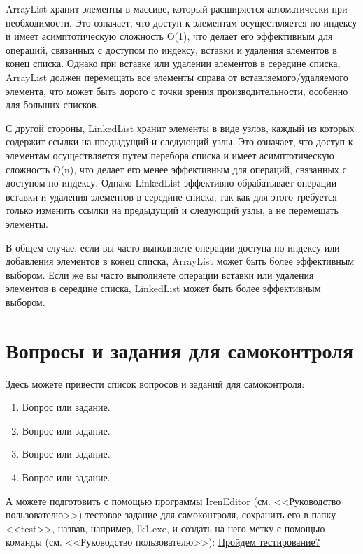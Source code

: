 ArrayList хранит элементы в массиве, который расширяется автоматически при необходимости. Это означает, что доступ к элементам осуществляется по индексу и имеет асимптотическую сложность O(1), что делает его эффективным для операций, связанных с доступом по индексу, вставки и удаления элементов в конец списка. Однако при вставке или удалении элементов в середине списка, ArrayList должен перемещать все элементы справа от вставляемого/удаляемого элемента, что может быть дорого с точки зрения производительности, особенно для больших списков.

С другой стороны, LinkedList хранит элементы в виде узлов, каждый из которых содержит ссылки на предыдущий и следующий узлы. Это означает, что доступ к элементам осуществляется путем перебора списка и имеет асимптотическую сложность O(n), что делает его менее эффективным для операций, связанных с доступом по индексу. Однако LinkedList эффективно обрабатывает операции вставки и удаления элементов в середине списка, так как для этого требуется только изменить ссылки на предыдущий и следующий узлы, а не перемещать элементы.

В общем случае, если вы часто выполняете операции доступа по индексу или добавления элементов в конец списка, ArrayList может быть более эффективным выбором. Если же вы часто выполняете операции вставки или удаления элементов в середине списка, LinkedList может быть более эффективным выбором.

\section*{Вопросы и задания для самоконтроля}%

Здесь можете привести список вопросов и заданий для самоконтроля:
\begin{enumerate}%
\item Вопрос или задание.
\item Вопрос или задание.
\item Вопрос или задание.
\item Вопрос или задание.
\end{enumerate}%

А можете подготовить с помощью программы IrenEditor (см. <<Руководство пользователю>>)
тестовое задание для самоконтроля, сохранить его в папку
<<test>>, назвав, например, lk1.exe, и создать на него метку с помощью
команды (см. <<Руководство пользователю>>): \href{run:test/lk1.exe}{Пройдем тестирование?}
